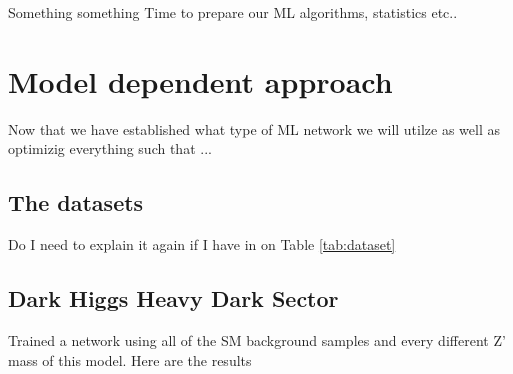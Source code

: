 \documentclass[12pt, a4paper]{book}
\begin{document}
\label{chap:Best_ML}
Something something Time to prepare our ML algorithms, statistics etc..

\chapter{Model dependent approach}
Now that we have established what type of ML network we will utilze as well as optimizig everything such that ... 

\section{The datasets}
Do I need to explain it again if I have in on Table \ref{tab:dataset}

\clearpage
\graphicspath{{../../../Plots/}}
\section{Dark Higgs Heavy Dark Sector}
Trained a network using all of the SM background samples and every different Z' mass of this model. Here are the results
\end{document}
